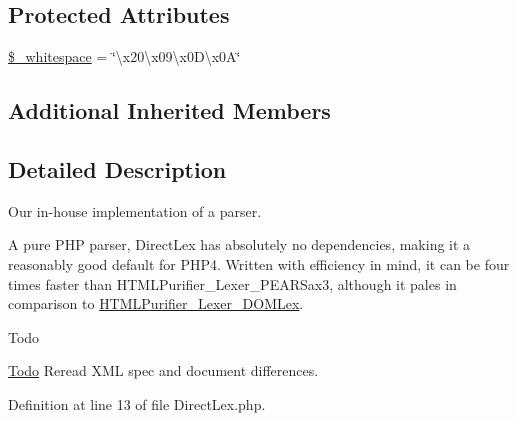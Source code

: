 \subsection*{Protected Attributes}
\begin{DoxyCompactItemize}
\item 
\hyperlink{classHTMLPurifier__Lexer__DirectLex_a0da4e3b01b4baaf3fd48269631d01006}{\$\+\_\+whitespace} = \char`\"{}\textbackslash{}x20\textbackslash{}x09\textbackslash{}x0\+D\textbackslash{}x0\+A\char`\"{}
\end{DoxyCompactItemize}
\subsection*{Additional Inherited Members}


\subsection{Detailed Description}
Our in-\/house implementation of a parser.

A pure P\+H\+P parser, Direct\+Lex has absolutely no dependencies, making it a reasonably good default for P\+H\+P4. Written with efficiency in mind, it can be four times faster than H\+T\+M\+L\+Purifier\+\_\+\+Lexer\+\_\+\+P\+E\+A\+R\+Sax3, although it pales in comparison to \hyperlink{classHTMLPurifier__Lexer__DOMLex}{H\+T\+M\+L\+Purifier\+\_\+\+Lexer\+\_\+\+D\+O\+M\+Lex}.

\begin{DoxyRefDesc}{Todo}
\item[\hyperlink{todo__todo000027}{Todo}]Reread X\+M\+L spec and document differences. \end{DoxyRefDesc}


Definition at line 13 of file Direct\+Lex.\+php.



